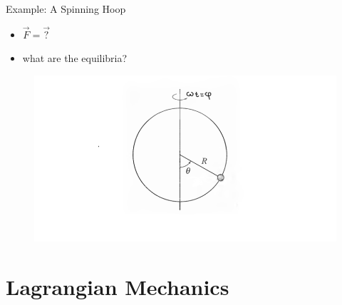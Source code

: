 \documentclass[10pt,xcolor={table,dvipsnames},t]{beamer}
\begin{document}
\begin{frame}{Example: A Spinning Hoop}
    \begin{itemize}
        \item $\vec{F} = \vec{\textrm{?}}$
        \item what are the equilibria?
    \end{itemize}

    \begin{figure}
        \centering
        \includegraphics[scale=0.5]{bead_on_hoop.png}
        \label{fig:bead_on_hoop}
    \end{figure}
\end{frame}

\section{Lagrangian Mechanics}
\end{document}
